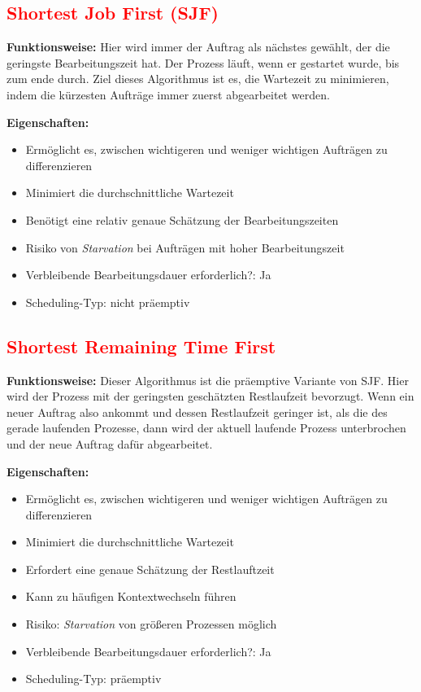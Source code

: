 \documentclass[
    12pt,               
    a4paper,            
    ngerman,            
    parskip=half,       
    headings=normal,   
    numbers=enddot,     
    toc=chapterentrywithdots 
]{scrreprt}\usepackage[utf8]{inputenc}
\begin{document}
\subsection{\textcolor{red}{Shortest Job First (SJF)}}
\textbf{Funktionsweise:} Hier wird immer der Auftrag als nächstes gewählt, der die geringste Bearbeitungszeit hat. Der Prozess läuft, wenn er gestartet wurde, bis zum ende durch. Ziel dieses Algorithmus ist es, die Wartezeit zu minimieren, indem die kürzesten Aufträge immer zuerst abgearbeitet werden.\citep[Vgl.][S.157f]{tanenbaum2015}

\textbf{Eigenschaften:}
\begin{itemize}
    \item[+] Ermöglicht es, zwischen wichtigeren und weniger wichtigen Aufträgen zu differenzieren
    \item[+] Minimiert die durchschnittliche Wartezeit
    \item[-] Benötigt eine relativ genaue Schätzung der Bearbeitungszeiten
    \item[-] Risiko von \textit{Starvation} bei Aufträgen mit hoher Bearbeitungszeit
    \item Verbleibende Bearbeitungsdauer erforderlich?: Ja
    \item Scheduling-Typ: nicht präemptiv
\end{itemize}

\subsection{\textcolor{red}{Shortest Remaining Time First}}
\textbf{Funktionsweise:} Dieser Algorithmus ist die präemptive Variante von SJF. Hier wird der Prozess mit der geringsten geschätzten Restlaufzeit bevorzugt. Wenn ein neuer Auftrag also ankommt und dessen Restlaufzeit geringer ist, als die des gerade laufenden Prozesse, dann wird der aktuell laufende Prozess unterbrochen und der neue Auftrag dafür abgearbeitet.\citep[Vgl.][S.158]{tanenbaum2015}

\textbf{Eigenschaften:}
\begin{itemize}
    \item[+] Ermöglicht es, zwischen wichtigeren und weniger wichtigen Aufträgen zu differenzieren
    \item[+] Minimiert die durchschnittliche Wartezeit
    \item[-] Erfordert eine genaue Schätzung der Restlauftzeit
    \item[-] Kann zu häufigen Kontextwechseln führen
    \item[-] Risiko: \textit{Starvation} von größeren Prozessen möglich
    \item Verbleibende Bearbeitungsdauer erforderlich?: Ja
    \item Scheduling-Typ: präemptiv
\end{itemize}
\end{document}
